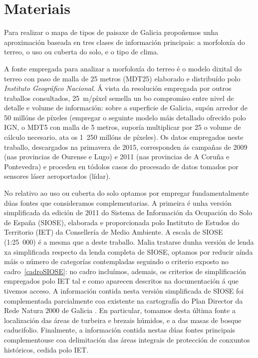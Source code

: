 \documentclass[11pt,a4paper]{article}
\begin{document}
\section{Materiais}


Para realizar o mapa de tipos de paisaxe de Galicia propoñemos unha aproximación baseada en tres clases de información principais: a morfoloxía do terreo, o uso ou cuberta do solo, e o tipo de clima.


A fonte empregada para analizar a morfoloxía do terreo é o modelo dixital do terreo con paso de malla de 25 metros (MDT25) elaborado e distribuído polo \emph{Instituto Geográfico Nacional}. Á vista da resolución empregada por outros traballos consultados, 25~m/píxel semella un bo compromiso entre nivel de detalle e volume de información: sobre a superficie de Galicia, supón arredor de 50 millóns de píxeles (empregar o seguinte modelo máis detallado ofrecido polo IGN, o MDT5 con malla de 5 metros, suporía multiplicar por 25 o volume de cálculo necesario, ata os 1~250 millóns de píxeles). Os datos empregados neste traballo, descargados na primavera de 2015, corresponden ás campañas de 2009 (nas provincias de Ourense e Lugo) e 2011 (nas provincias de A Coruña e Pontevedra) e proceden en tódolos casos do procesado de datos tomados por sensores láser aeroportados (lídar).


No relativo ao uso ou cuberta do solo optamos por empregar fundamentalmente dúas fontes que consideramos complementarias. A primeira é unha versión simplificada da edición de 2011 do Sistema de Información da Ocupación do Solo de España (SIOSE), elaborada e proporcionada polo Instituto de Estudos do Territorio (IET) da Consellería de Medio Ambiente. A escala de SIOSE (1:25~000) é a mesma que a deste traballo. Malia tratarse dunha versión de lenda xa simplificada respecto da lenda completa de SIOSE, optamos por reducir aínda máis o número de categorías contempladas seguindo o criterio exposto no cadro~\ref{cadroSIOSE}: no cadro incluímos, ademais, os criterios de simplificación empregados polo IET tal e como aparecen descritos na documentación á que tivemos acceso. A información contida nesta versión simplificada de SIOSE foi complementada parcialmente coa existente na cartografía do Plan Director da Rede Natura 2000 de Galicia \citep{PDRN2011}. En particular, tomamos desta última fonte a localización das áreas de turbeira e brezais húmidos, e a das masas de bosque caducifolio. Finalmente, a información contida nestas dúas fontes principais complementouse coa delimitación das áreas integrais de protección de conxuntos históricos, cedida polo IET.
\end{document}
